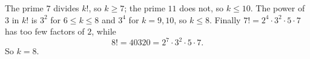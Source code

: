The prime $7$ divides $k!$, so $k\ge7$; the prime $11$ does not, so $k\le10$. The power of $3$ in $k!$ is $3^2$ for $6\le k\le8$ and $3^4$ for $k=9,10$, so $k\le8$. Finally $7!=2^4\cdot3^2\cdot5\cdot7$ has too few factors of $2$, while
\[8!=40320=2^7\cdot3^2\cdot5\cdot7.\]
So $k=\boxed{8}$.
